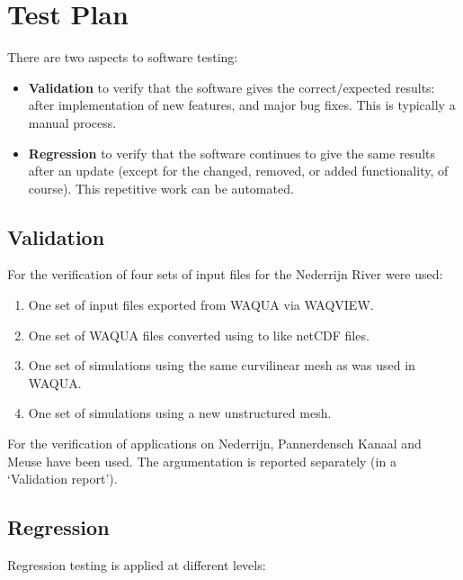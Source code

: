 \chapter{Test Plan} \label{Chp:TestPlan}

There are two aspects to software testing:

\begin{itemize}
\item \textbf{Validation} to verify that the software gives the correct/expected results: after implementation of new features, and major bug fixes.
This is typically a manual process.
\item \textbf{Regression} to verify that the software continues to give the same results after an update (except for the changed, removed, or added functionality, of course).
This repetitive work can be automated.
\end{itemize}


\section{Validation}

For the verification of  four sets of input files for the Nederrijn River were used:

\begin{enumerate}
\item One set of input files exported from WAQUA via WAQVIEW.
\item One set of WAQUA files converted using  to \dflowfm like netCDF files.
\item One set of \dflowfm simulations using the same curvilinear mesh as was used in WAQUA.
\item One set of \dflowfm simulations using a new unstructured mesh.
\end{enumerate}

For the verification of  applications on Nederrijn, Pannerdensch Kanaal and Meuse have been used.
The argumentation is reported separately (in a `Validation report').


\section{Regression}

Regression testing is applied at different levels:

